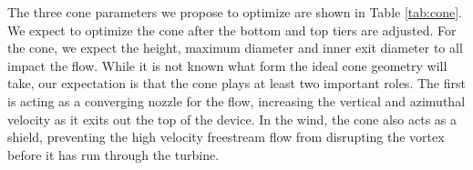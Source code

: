 %
%

The three cone parameters we propose to optimize are shown in Table
\ref{tab:cone}. We expect to optimize the cone after the bottom and top
tiers are adjusted. For the cone, we expect the height, maximum diameter
and inner exit diameter to all impact the flow. While it is not known
what form the ideal cone geometry will take, our expectation is that the
cone plays at least two important roles. The first is acting as a
converging nozzle for the flow, increasing the vertical and azimuthal
velocity as it exits out the top of the device. In the wind, the cone
also acts as a shield, preventing the high velocity freestream flow from
disrupting the vortex before it has run through the turbine. 

